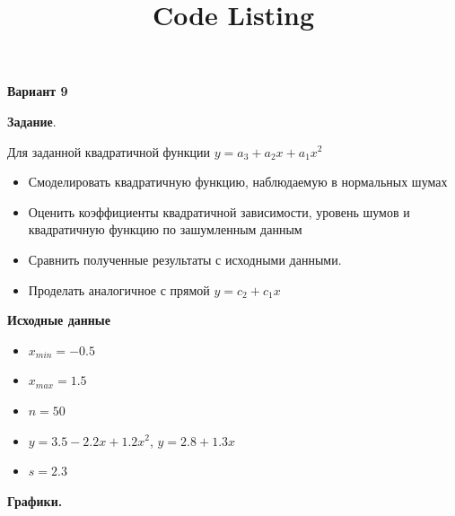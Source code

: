 \documentclass{article}
\title{Code Listing}
\begin{document}
	{\bf Вариант 9}
	
	\textbf{Задание}.
	
	Для заданной квадратичной функции $y = a_3+a_2 x+a_1 x^2$
	\begin{itemize}
		\item Смоделировать квадратичную функцию, наблюдаемую в нормальных шумах
		\item Оценить коэффициенты квадратичной зависимости, уровень шумов и квадратичную функцию по зашумленным данным
		\item Сравнить полученные результаты с исходными данными.
		\item Проделать аналогичное с прямой $y=c_2+c_1 x$
	\end{itemize}

	\textbf{Исходные данные}
	\begin{itemize}
		\item $x_{min}=-0.5$
		\item $x_{max}=1.5$
		\item $n=50$
		\item $y=3.5-2.2x+1.2x^2$, $y=2.8+1.3 x$
		\item $s=2.3$
	\end{itemize}
	
	\bigskip
	
	{\bf Графики.}\\
	
\end{document}

